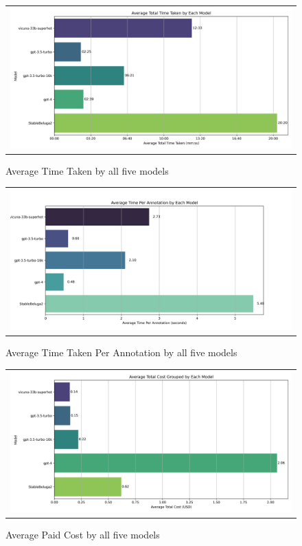 \begin{figure}[htpb]
  \centering
  \begin{tabular}{c}
  \includegraphics[width=14cm]{images/open-runtime.png}
  \end{tabular}
  \caption[Open Source Time]{Average Time Taken by all five models}\label{fig:open-runtime}
\end{figure}

\begin{figure}[htpb]
  \centering
  \begin{tabular}{c}
  \includegraphics[width=14cm]{images/open-anno-cost.png}
  \end{tabular}
  \caption[Open Source Cost]{Average Time Taken Per Annotation by all five models}\label{fig:open-relative-cost}
\end{figure}

\begin{figure}[htpb]
  \centering
  \begin{tabular}{c}
  \includegraphics[width=14cm]{images/open-cost.png}
  \end{tabular}
  \caption[Open Source Time]{Average Paid Cost by all five models}\label{fig:open-cost}
\end{figure}

